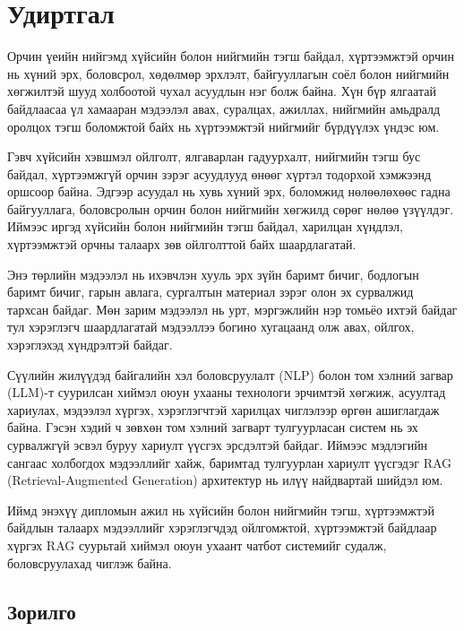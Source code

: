 
\chapter*{Удиртгал}


Орчин үеийн нийгэмд хүйсийн болон нийгмийн тэгш байдал, хүртээмжтэй орчин нь хүний эрх, боловсрол, хөдөлмөр эрхлэлт, байгууллагын соёл болон нийгмийн хөгжилтэй шууд холбоотой чухал асуудлын нэг болж байна. Хүн бүр ялгаатай байдлаасаа үл хамааран мэдээлэл авах, суралцах, ажиллах, нийгмийн амьдралд оролцох тэгш боломжтой байх нь хүртээмжтэй нийгмийг бүрдүүлэх үндэс юм.

Гэвч хүйсийн хэвшмэл ойлголт, ялгаварлан гадуурхалт, нийгмийн тэгш бус байдал, хүртээмжгүй орчин зэрэг асуудлууд өнөөг хүртэл тодорхой хэмжээнд оршсоор байна. Эдгээр асуудал нь хувь хүний эрх, боломжид нөлөөлөхөөс гадна байгууллага, боловсролын орчин болон нийгмийн хөгжилд сөрөг нөлөө үзүүлдэг. Иймээс иргэд хүйсийн болон нийгмийн тэгш байдал, харилцан хүндлэл, хүртээмжтэй орчны талаарх зөв ойлголттой байх шаардлагатай.

Энэ төрлийн мэдээлэл нь ихэвчлэн хууль эрх зүйн баримт бичиг, бодлогын баримт бичиг, гарын авлага, сургалтын материал зэрэг олон эх сурвалжид тархсан байдаг. Мөн зарим мэдээлэл нь урт, мэргэжлийн нэр томьёо ихтэй байдаг тул хэрэглэгч шаардлагатай мэдээллээ богино хугацаанд олж авах, ойлгох, хэрэглэхэд хүндрэлтэй байдаг.

Сүүлийн жилүүдэд байгалийн хэл боловсруулалт (NLP) болон том хэлний загвар (LLM)-т суурилсан хиймэл оюун ухааны технологи эрчимтэй хөгжиж, асуултад хариулах, мэдээлэл хүргэх, хэрэглэгчтэй харилцах чиглэлээр өргөн ашиглагдаж байна. Гэсэн хэдий ч зөвхөн том хэлний загварт тулгуурласан систем нь эх сурвалжгүй эсвэл буруу хариулт үүсгэх эрсдэлтэй байдаг. Иймээс мэдлэгийн сангаас холбогдох мэдээллийг хайж, баримтад тулгуурлан хариулт үүсгэдэг RAG (Retrieval-Augmented Generation) архитектур нь илүү найдвартай шийдэл юм.

Иймд энэхүү дипломын ажил нь хүйсийн болон нийгмийн тэгш, хүртээмжтэй байдлын талаарх мэдээллийг хэрэглэгчдэд ойлгомжтой, хүртээмжтэй байдлаар хүргэх RAG суурьтай хиймэл оюун ухаант чатбот системийг судалж, боловсруулахад чиглэж байна.

\section*{Зорилго}

